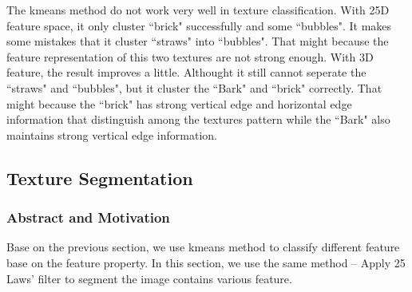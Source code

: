 \documentclass[11pt]{article}
\begin{document}
\begin{table}[!htp]
\centering
\caption{Variance of the 25-D features}
\end{table}
The kmeans method do not work very well in texture classification. With 25D feature space, it only cluster ``brick" successfully and some ``bubbles". It makes some mistakes that it cluster ``straws" into ``bubbles". That might because the feature representation of this two textures are not strong enough. 
With 3D feature, the result improves a little. Althought it still cannot seperate the ``straws" and ``bubbles", but it cluster the ``Bark" and ``brick" correctly. That might because the ``brick" has strong vertical edge and horizontal edge information that distinguish among the textures pattern while the ``Bark" also maintains strong vertical edge information.

\subsection{Texture Segmentation}

\subsubsection{Abstract and Motivation}
Base on the previous section, we use kmeans method to classify different feature base on the feature property. In this section, we use the same method -- Apply 25 Laws' filter to segment the image contains various feature. 
\end{document}
